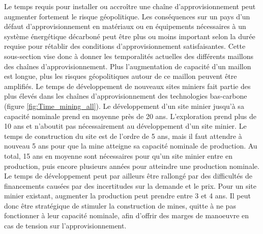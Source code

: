 Le temps requis pour installer ou accroître une chaîne d'approvisionnement peut augmenter fortement le risque géopolitique. Les conséquences sur un pays d'un défaut d'approvisionnement en matériaux ou en équipements nécessaires à un système énergétique décarboné peut être plus ou moins important selon la durée requise pour rétablir des conditions d'approvisionnement satisfaisantes. Cette sous-section vise donc à donner les temporalités actuelles des différents maillons des chaînes d'approvisionnement. Plus l'augmentation de capacité d'un maillon est longue, plus les risques géopolitiques autour de ce maillon peuvent être amplifiés.\smallbreak
Le temps de développement de nouveaux sites miniers fait partie des plus élevés dans les chaînes d'approvisionnement des technologies bas-carbone (figure \ref{fig:Time_mining_all}). Le développement d'un site minier jusqu'à sa capacité nominale prend en moyenne près de 20 ans. L'exploration prend plus de 10 ans et n'aboutit pas nécessairement au développement d'un site minier. Le temps de construction du site est de l'ordre de 5 ans, mais il faut attendre à nouveau 5 ans pour que la mine atteigne sa capacité nominale de production. Au total, 15 ans en moyenne sont nécessaires pour qu'un site minier entre en production, puis encore plusieurs années pour atteindre une production nominale. Le temps de développement peut par ailleurs être rallongé par des difficultés de financements causées par des incertitudes sur la demande et le prix.\smallbreak
Pour un site minier existant, augmenter la production peut prendre entre 3 et 4 ans. Il peut donc être stratégique de stimuler la construction de mines, quitte à ne pas fonctionner à leur capacité nominale, afin d'offrir des marges de manoeuvre en cas de tension sur l'approvisionnement.\smallbreak
